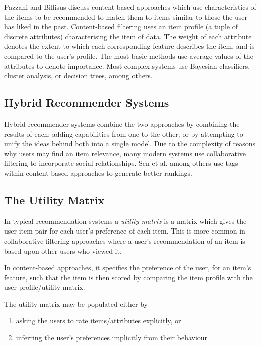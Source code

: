 Pazzani and Billisus discuss content-based approaches \cite{ContentRecommenderPazzani} which use characteristics of the items to be recommended to match them to items similar to those the user has liked in the past. Content-based filtering uses an item profile (a tuple of discrete attributes) characterising the item of data. The weight of each attribute denotes the extent to which each corresponding feature describes the item, and is compared to the user's profile. The most basic methods use average values of the attributes to denote importance. Most complex systems use Bayesian classifiers, cluster analysis, or decision trees, among others.

\subsection{Hybrid Recommender Systems}

Hybrid recommender systems combine the two approaches by combining the results of each; adding capabilities from one to the other; or by attempting to unify the ideas behind both into a single model. Due to the complexity of reasons why users may find an item relevance, many modern systems \cite{ReferralWeb} use collaborative filtering to incorporate social relationships. Sen et al. \cite{SenTagommender} among others use tags within content-based approaches to generate better rankings. 

\subsection{The Utility Matrix}

In typical recommendation systems a \textit{utility matrix} is a matrix which gives the user-item pair for each user's preference of each item. This is more common in collaborative filtering approaches where a user's recommendation of an item is based upon other users who viewed it. 

In content-based approaches, it specifies the preference of the user, for an item's feature, such that the item is then scored by comparing the item profile with the user profile/utility matrix.

The utility matrix may be populated either by
\begin{enumerate}
  \item asking the users to rate items/attributes explicitly, or
  \item inferring the user's preferences implicitly from their behaviour
\end{enumerate}
